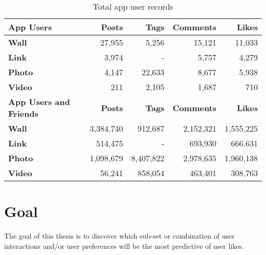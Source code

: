 \begin{table}[!htbp]
\centering
	\begin{tabular}{|l|r|r|r|r|} %
		\hline
		\textbf{App Users} & \textbf{Posts} & \textbf{Tags} & \textbf{Comments} & \textbf{Likes}  \\ \hline
		\textbf{Wall} & 27,955 & 5,256 & 15,121 & 11,033 \\ \hline
		\textbf{Link} & 3,974 & - & 5,757 & 4,279 \\ \hline
		\textbf{Photo} & 4,147 & 22,633 & 8,677 & 5,938 \\ \hline
		\textbf{Video} & 211 & 2,105 & 1,687 & 710 \\ \hline
		 \hline
		\textbf{App Users and Friends} & \textbf{Posts} & \textbf{Tags} & \textbf{Comments} & \textbf{Likes}  \\ \hline
		\textbf{Wall} & 3,384,740 & 912,687 & 2,152,321 & 1,555,225 \\ \hline
		\textbf{Link} & 514,475 & - & 693,930 & 666,631 \\ \hline
		\textbf{Photo} & 1,098,679 & 8,407,822 & 2,978,635 & 1,960,138 \\ \hline
		\textbf{Video} & 56,241 & 858,054 & 463,401 & 308,763 \\ \hline
	\end{tabular}
	\caption{Total app user records}
	\label{tab:revpol}
\end{table}

\clearpage
\section{Goal}
\label{sec:goal}

The goal of this thesis is to discover which sub-set or combination of user interactions and/or user preferences will be the most predictive of user likes. 


